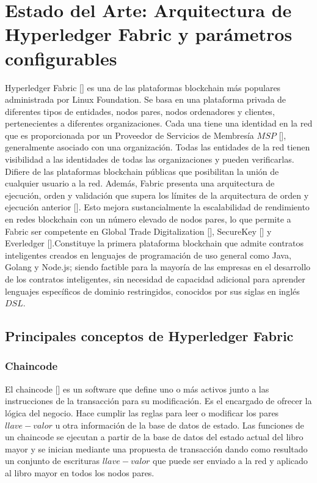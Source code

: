 \chapter{Estado del Arte: Arquitectura de Hyperledger Fabric y par\'ametros configurables}\label{chapter:state-of-the-art}

Hyperledger Fabric [\cite{HF}] es una de las plataformas blockchain m\'as populares administrada por Linux Foundation. Se basa en una plataforma privada de diferentes tipos de entidades, nodos pares, nodos ordenadores y clientes, pertenecientes a diferentes organizaciones. Cada una tiene una identidad en la red que es proporcionada por un Proveedor de Servicios de Membres\'ia $MSP$ [\cite{MSP}], generalmente asociado con una organizaci\'on. Todas las entidades de la red tienen visibilidad a las identidades de todas las organizaciones y pueden verificarlas. Difiere de las plataformas blockchain p\'ublicas que posibilitan la uni\'on de cualquier usuario a la red. Adem\'as, Fabric presenta una arquitectura de ejecuci\'on, orden y validaci\'on que supera los l\'imites de la arquitectura de orden y ejecuci\'on anterior [\cite{androulaki2018hyperledger}]. Esto mejora sustancialmente la escalabilidad de rendimiento en redes blockchain con un n\'umero elevado de nodos pares, lo que permite a Fabric ser competente en Global Trade Digitalization [\cite{digitizing-global}], SecureKey [\cite{securekey}] y Everledger [\cite{everledger}].Constituye la primera plataforma blockchain que admite contratos inteligentes creados en lenguajes de programaci\'on de uso general como Java, Golang y Node.js; siendo factible para la mayor\'ia de las empresas en el desarrollo de los contratos inteligentes, sin necesidad de capacidad adicional para aprender lenguajes espec\'ificos de dominio restringidos, conocidos por sus siglas en ingl\'es $DSL$. 

\section{Principales conceptos de Hyperledger Fabric}

\subsection{Chaincode}
El chaincode [\cite{chaincodes}] es un software que define uno o m\'as activos junto a las instrucciones de la transacci\'on para su modificaci\'on. Es el encargado de ofrecer la l\'ogica del negocio. Hace cumplir las reglas para leer o modificar los pares $llave-valor$ u otra informaci\'on de la base de datos de estado. Las funciones de un chaincode se ejecutan a partir de la base de datos del estado actual del libro mayor y se inician mediante una propuesta de transacci\'on dando como resultado un conjunto de escrituras $llave-valor$ que puede ser enviado a la red y aplicado al libro mayor en todos los nodos pares.


